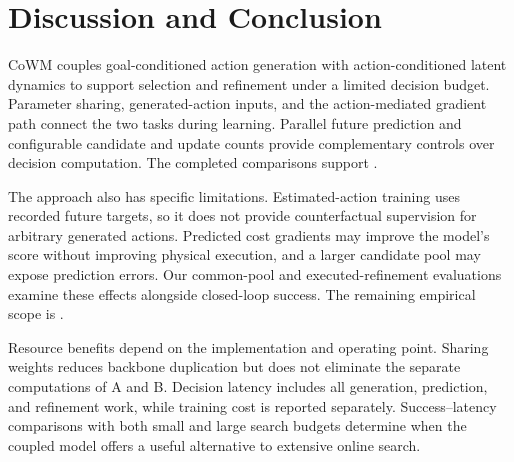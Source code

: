 \section{Discussion and Conclusion}
\label{sec:limitations}
CoWM couples goal-conditioned action generation with action-conditioned latent dynamics to support selection and refinement under a limited decision budget. Parameter sharing, generated-action inputs, and the action-mediated gradient path connect the two tasks during learning. Parallel future prediction and configurable candidate and update counts provide complementary controls over decision computation. The completed comparisons support .

The approach also has specific limitations. Estimated-action training uses recorded future targets, so it does not provide counterfactual supervision for arbitrary generated actions. Predicted cost gradients may improve the model's score without improving physical execution, and a larger candidate pool may expose prediction errors. Our common-pool and executed-refinement evaluations examine these effects alongside closed-loop success. The remaining empirical scope is .

Resource benefits depend on the implementation and operating point. Sharing weights reduces backbone duplication but does not eliminate the separate computations of A and B. Decision latency includes all generation, prediction, and refinement work, while training cost is reported separately. Success--latency comparisons with both small and large search budgets determine when the coupled model offers a useful alternative to extensive online search.

